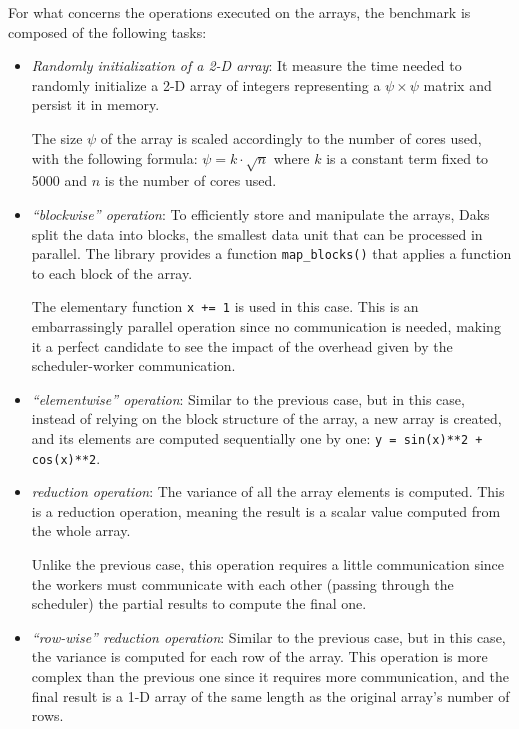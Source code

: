 For what concerns the operations executed on the arrays, the benchmark is
composed of the following tasks:

\begin{itemize}
  \itemsep0em
  \item \textit{Randomly initialization of a 2-D array}: It measure the time
    needed to randomly initialize a 2-D array of integers representing a
    $\psi\times\psi$ matrix and persist it in memory.

    The size $\psi$ of the array is scaled accordingly to the number of cores
    used, with the following formula: $\psi = k \cdot \sqrt{n}$ where $k$ is a
    constant term fixed to 5000 and $n$ is the number of cores used.
  \item \textit{``blockwise'' operation}: To efficiently store and manipulate
    the arrays, Daks split the data into blocks, the smallest data unit that
    can be processed in parallel. The library provides a function
    \texttt{map\_blocks()} that applies a function to each block of the array.

    The elementary function \texttt{x += 1} is used in this case.
    This is an embarrassingly parallel operation since no communication is
    needed, making it a perfect candidate to see the impact of the overhead
    given by the scheduler-worker communication.
  \item \textit{``elementwise'' operation}: Similar to the previous case, but in
    this case, instead of relying on the block structure of the array, a new
    array is created, and its elements are computed sequentially one by one:
    \texttt{y = sin(x)**2 + cos(x)**2}.
  \item \textit{reduction operation}: The variance of all the array elements is
    computed. This is a reduction operation, meaning the result is a scalar
    value computed from the whole array.

    Unlike the previous case, this operation requires a little communication
    since the workers must communicate with each other (passing through the
    scheduler) the partial results to compute the final one.
 \item \textit{``row-wise'' reduction operation}: Similar to the previous case,
   but in this case, the variance is computed for each row of the array.
    This operation is more complex than the previous one since it requires more
    communication, and the final result is a 1-D array of the same length as the
    original array's number of rows.


\end{itemize}
